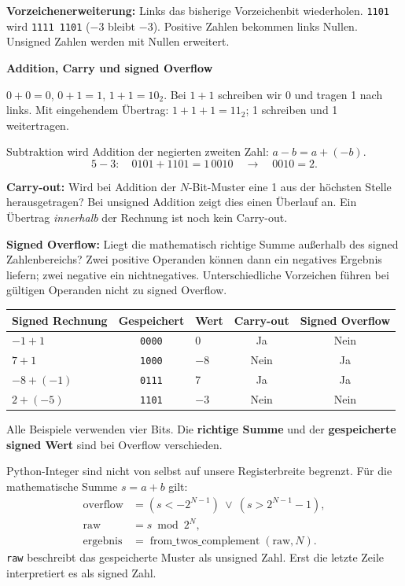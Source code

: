 \documentclass[10pt,a4paper]{article}
\newcommand{\titlepagepart}[2]{\vspace*{-4mm}{\sffamily\small #1}\par{\sffamily\LARGE\bfseries #2}\par\vspace{2mm}}
\newcommand{\block}[1]{\par\vspace{2mm}{\sffamily\large\bfseries #1}\par}
\newcommand{\code}[1]{\texttt{#1}}
\begin{document}
\textbf{Vorzeichenerweiterung:} Links das bisherige Vorzeichenbit wiederholen.
\code{1101} wird \code{1111 1101} ($-3$ bleibt $-3$).
Positive Zahlen bekommen links Nullen. Unsigned Zahlen werden mit Nullen erweitert.

\newpage
\titlepagepart{03 / RECHNEN}{Addition, Carry und signed Overflow}
\block{Binäre Addition und Subtraktion}
$0+0=0$, $0+1=1$, $1+1=10_2$.
Bei $1+1$ schreiben wir 0 und tragen 1 nach links. Mit eingehendem Übertrag:
$1+1+1=11_2$; 1 schreiben und 1 weitertragen.

Subtraktion wird Addition der negierten zweiten Zahl: $a-b=a+(-b)$.
\[5-3:\quad0101+1101=1\,0010\quad\longrightarrow\quad0010=2.\]
\block{Zwei unterschiedliche Fragen}
\textbf{Carry-out:} Wird bei Addition der $N$-Bit-Muster eine 1 aus der höchsten
Stelle herausgetragen? Bei unsigned Addition zeigt dies einen Überlauf an.
Ein Übertrag \emph{innerhalb} der Rechnung ist noch kein Carry-out.

\textbf{Signed Overflow:} Liegt die mathematisch richtige Summe außerhalb des
signed Zahlenbereichs? Zwei positive Operanden können dann ein negatives Ergebnis
liefern; zwei negative ein nichtnegatives. Unterschiedliche Vorzeichen führen
bei gültigen Operanden nicht zu signed Overflow.
\begin{center}
\begin{tabular}{lclcc}\toprule
Signed Rechnung&Gespeichert&Wert&Carry-out&Signed Overflow\\\midrule
$-1+1$&\code{0000}&0&Ja&Nein\\
$7+1$&\code{1000}&$-8$&Nein&Ja\\
$-8+(-1)$&\code{0111}&7&Ja&Ja\\
$2+(-5)$&\code{1101}&$-3$&Nein&Nein\\\bottomrule
\end{tabular}
\end{center}
Alle Beispiele verwenden vier Bits. Die \textbf{richtige Summe} und der
\textbf{gespeicherte signed Wert} sind bei Overflow verschieden.

\block{Was die Python-Funktion nachbildet}
Python-Integer sind nicht von selbst auf unsere Registerbreite begrenzt.
Für die mathematische Summe $s=a+b$ gilt:
\[
\begin{aligned}
\mathrm{overflow}&=(s<-2^{N-1})\ \lor\ (s>2^{N-1}-1),\\
\mathrm{raw}&=s\bmod 2^N,\\
\mathrm{ergebnis}&=\operatorname{from\_twos\_complement}(\mathrm{raw},N).
\end{aligned}
\]
\code{raw} beschreibt das gespeicherte Muster als unsigned Zahl. Erst die letzte
Zeile interpretiert es als signed Zahl.
\end{document}
